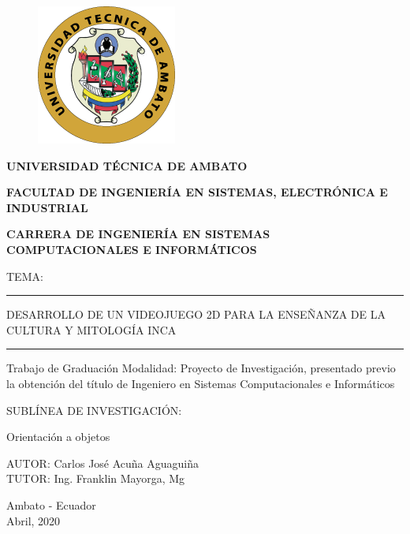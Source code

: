 \documentclass[a4paper, openright, 12pt]{report}
\begin{document}
\begin{titlepage}

\begin{figure}[h]
\captionsetup{justification=centering,margin=2cm}
\includegraphics[scale=1]{escudoUta}
\centering
\end{figure}
\begin{center}
\textbf{UNIVERSIDAD TÉCNICA DE AMBATO}
\end{center}
\begin{center}
\textbf{FACULTAD DE INGENIERÍA EN SISTEMAS, ELECTRÓNICA E INDUSTRIAL}
\end{center}
\begin{center}
\textbf{CARRERA DE INGENIERÍA EN SISTEMAS COMPUTACIONALES E INFORMÁTICOS}
\end{center}
\begin{center}
TEMA:
\end{center}
\begin{center}
\rule{150mm}{0.1mm}
\end{center}
\begin{center}
DESARROLLO DE UN VIDEOJUEGO 2D PARA LA ENSEÑANZA DE LA CULTURA Y MITOLOGÍA INCA
\end{center}
\begin{center}
\rule{150mm}{0.1mm}
\end{center}
\begin{center}
Trabajo de Graduación Modalidad: Proyecto de Investigación, presentado previo la obtención del título de Ingeniero en Sistemas Computacionales e Informáticos
\end{center}
\begin{center}
SUBLÍNEA DE INVESTIGACIÓN:
\end{center}
\begin{center}
Orientación a objetos
\end{center}
\begin{center}
AUTOR: Carlos José Acuña Aguaguiña\\
TUTOR: Ing. Franklin Mayorga, Mg
\end{center}
\begin{center}
Ambato - Ecuador\\
Abril, 2020
\end{center}
\end{titlepage}
\end{document}
